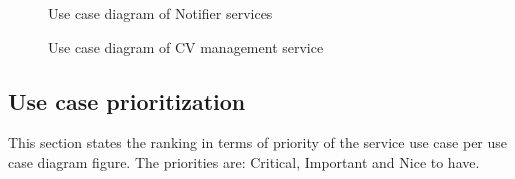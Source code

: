 \documentclass[12pt]{article}
\begin{document}
\begin{figure}[H]
\centering	
{}
\caption{Use case diagram of Notifier services}
\end{figure}

\begin{figure}[H]
\centering	
{}
\caption{Use case diagram of CV management service}
\end{figure}



\newpage
\subsection{Use case prioritization}
\vspace{0.2in}
This section states the ranking in terms of priority of the service use case per use case diagram figure. The priorities are: Critical, Important and Nice to have.\\ 
\end{document}
